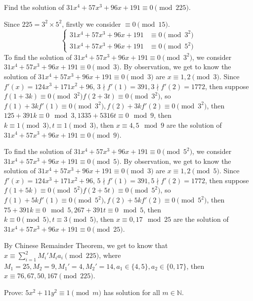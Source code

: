 \documentclass{ctexart}
\begin{document}
\begin{problem}\label{pro:2}
  Find the solution of \(31x^4 + 57x^3 + 96x + 191 \equiv 0 \pmod{ 225}\).
\end{problem}
\begin{solution}
  Since \(225=3^2\times5^2\), firstly we consider \( \equiv 0 \pmod{15}\).
  \[
    \begin{cases}
      31x^4 + 57x^3 + 96x + 191 & \equiv 0 \pmod{3^2} \\
      31x^4 + 57x^3 + 96x + 191 & \equiv 0 \pmod{5^2}
    \end{cases}
  \]
  To find the solution of \(31x^4 + 57x^3 + 96x + 191 \equiv 0 \pmod{3^2}\), we consider \(31x^4 + 57x^3 + 96x + 191 \equiv 0 \pmod{3}\).
  By observation, we get to know the solution of \(31x^4 + 57x^3 + 96x + 191 \equiv 0 \pmod{3}\) are \(x \equiv 1,2 \pmod{3}\).
  Since \(f'(x)=124x^3 + 171x^2 + 96\), \(3 \nmid f'(1)=391, 3 \nmid f'(2)=1772\), then suppose \(f(1 + 3 k) \equiv 0 \pmod{3^2}
  f(2 + 3t) \equiv 0 \pmod{3^2}\),
  so \(f(1) + 3k f'(1) \equiv 0 \pmod{3^2}, f(2) + 3kf'(2) \equiv 0 \pmod{3^2}\), then \(125 + 391k \equiv 0 \mod 3,
  1335 + 5316t \equiv 0 \mod 9\), then \(k \equiv 1 \pmod{3},t \equiv 1 \pmod{3}\),
  then \(x \equiv 4, 5\mod 9\) are the solution of \(31x^4 + 57x^3 + 96x + 191 \equiv 0 \pmod{9}\).

  To find the solution of \(31x^4 + 57x^3 + 96x + 191 \equiv 0 \pmod{5^2}\), we consider \(31x^4 + 57x^3 + 96x + 191 \equiv 0 \pmod{5}\).
  By observation, we get to know the solution of \(31x^4 + 57x^3 + 96x + 191 \equiv 0 \pmod{3}\) are \(x \equiv 1,2 \pmod{5}\).
  Since \(f'(x)=124x^3 + 171x^2 + 96\), \(5 \nmid f'(1)=391, 5 \nmid f'(2)=1772\), then suppose \(f(1 + 5 k) \equiv 0 \pmod{5^2}
  f(2 + 5t) \equiv 0 \pmod{5^2}\),
  so \(f(1) + 5k f'(1) \equiv 0 \pmod{5^2}, f(2) + 5kf'(2) \equiv 0 \pmod{5^2}\), then \(75 + 391k \equiv 0 \mod 5,
  267 + 391t \equiv 0 \mod 5\), then \(k \equiv 0 \pmod{5},t \equiv 3 \pmod{5}\),
  then \(x \equiv 0, 17\mod 25\) are the solution of \(31x^4 + 57x^3 + 96x + 191 \equiv 0 \pmod{25}\).

  By Chinese Remainder Theorem, we get to know that \(x \equiv \sum_{i=1}^{2} M_i' M_i a_i \pmod{225}\),
  where \(M_1=25,M_2=9,M_1'=4,M_2'=14,a_1 \in \{4,5\}, a_2 \in \{0,17\}\), then \(x \equiv 76,67,50,167 \pmod{225}\).
\end{solution}
\begin{problem}\label{pro:3}
  Prove: \(5x^2 + 11y^2 \equiv 1 \pmod{ m}\) has solution for all \(m \in \mathbb{N}\).
\end{problem}
\end{document}
